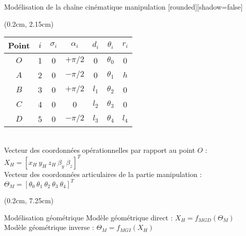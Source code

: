 \documentclass[french]{beamer}
\begin{document}
\begin{frame}{Modélisation de la chaîne cinématique manipulation}
[rounded][shadow=false]
{
\scriptsize
\begin{textblock*}{6cm}(0.2cm, 2.15cm)
\\ 
\begin{tabular}{| c | c |  c |  c |  c |  c |  c | }
\hline
Point	&$i$ & $\sigma_i$	& $\alpha_i$ & $d_i$ & $\theta_i$ & $r_i$ \\
\hline 
 $O$	& 1 &    0        &$+\pi/2$    &   0   &    $\theta_0$   &   0    \\
 $A$	& 2 &    0        &$-\pi/2$	   &   0   &    $\theta_1$   &   $h$    \\
 $B$	& 3 &    0        &$+\pi/2$    &$l_1$  &    $\theta_2$   &   0    \\
 $C$	& 4 &    0        &     0      &$l_2$  &    $\theta_3$   &   0    \\
 $D$	& 5 &    0        &$-\pi/2$	   &$l_3$  &    $\theta_4$   &   $l_4$    \\
\hline
\end{tabular}\\
\vspace{0.25cm}
Vecteur des coordonnées opérationnelles par rapport au point $O$ :\\
$X_H = [x_H\ y_H\ z_H\ \beta_y\ \beta_z]^T$\\

\vspace{0.25cm}
Vecteur des coordonnées articulaires de la partie manipulation :\\
$\Theta_M = [\theta_0\ \theta_1\ \theta_2\ \theta_3\ \theta_4]^T$
\end{textblock*}


\begin{textblock*}{6cm}(0.2cm, 7.25cm)
\begin{block}{Modélisation géométrique}
Modèle géométrique direct : 
$X_H = f_{MGD}(\Theta_M)$\\
Modèle géométrique inverse : 
$\Theta_M = f_{MGI}(X_H)$
\end{block}
\end{textblock*}


}
\end{frame}
\end{document}

